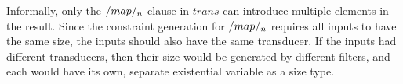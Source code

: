 Informally, only the $\Hs/map/_n$ clause in $trans$ can introduce multiple elements in the result.
Since the constraint generation for $\Hs/map/_n$ requires all inputs to have the same size, the inputs should also have the same transducer.
If the inputs had different transducers, then their size would be generated by different filters, and each would have its own, separate existential variable as a size type.


 
% 


